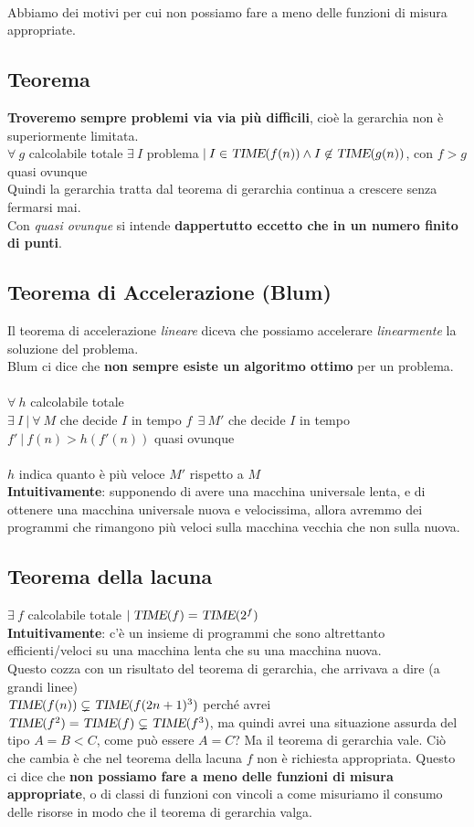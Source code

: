 \documentclass[10pt]{book}
\begin{document}
\paragraph{}Abbiamo dei motivi per cui non possiamo fare a meno delle funzioni di misura appropriate.
\subsection{Teorema} \textbf{Troveremo sempre problemi via via più difficili}, cioè la gerarchia non è superiormente limitata.\\
$\forall\:g$ calcolabile totale $\exists\:I$ problema$\:|\:I\in\textsl{TIME}(f(n))\wedge I\not\in\textsl{TIME}(g(n))$, con $f > g$ quasi ovunque\\
Quindi la gerarchia tratta dal teorema di gerarchia continua a crescere senza fermarsi mai.\\
Con \textit{quasi ovunque} si intende \textbf{dappertutto eccetto che in un numero finito di punti}.
\subsection{Teorema di Accelerazione (Blum)} Il teorema di accelerazione \textit{lineare} diceva che possiamo accelerare \textit{linearmente} la soluzione del problema.\\
Blum ci dice che \textbf{non sempre esiste un algoritmo ottimo} per un problema.\\\\
$\forall\:h$ calcolabile totale\\
$\exists\:I\:|\:\forall\:M$ che decide $I$ in tempo $f\:\:\exists\:M'$ che decide $I$ in tempo $f'\:|\:f(n)>h(f'(n))$ quasi ovunque\\\\
$h$ indica quanto è più veloce $M'$ rispetto a $M$\\
\textbf{Intuitivamente}: supponendo di avere una macchina universale lenta, e di ottenere una macchina universale nuova e velocissima, allora avremmo dei programmi che rimangono più veloci sulla macchina vecchia che non sulla nuova.
\subsection{Teorema della lacuna}
$\exists\:f$ calcolabile totale $|\:\textsl{TIME}(f) = \textsl{TIME}(2^f)$\\
\textbf{Intuitivamente}: c'è un insieme di programmi che sono altrettanto efficienti/veloci su una macchina lenta che su una macchina nuova.\\
Questo cozza con un risultato del teorema di gerarchia, che arrivava a dire (a grandi linee)\\$\textsl{TIME}(f(n)) \subsetneq \textsl{TIME}(f(2n + 1)^3)$ perché avrei $\textsl{TIME}(f^2) = \textsl{TIME}(f) \subsetneq \textsl{TIME}(f^3)$, ma quindi avrei una situazione assurda del tipo $A = B < C$, come può essere $A = C$? Ma il teorema di gerarchia vale. Ciò che cambia è che nel teorema della lacuna $f$ non è richiesta appropriata. Questo ci dice che \textbf{non possiamo fare a meno delle funzioni di misura appropriate}, o di classi di funzioni con vincoli a come misuriamo il consumo delle risorse in modo che il teorema di gerarchia valga.
\end{document}
